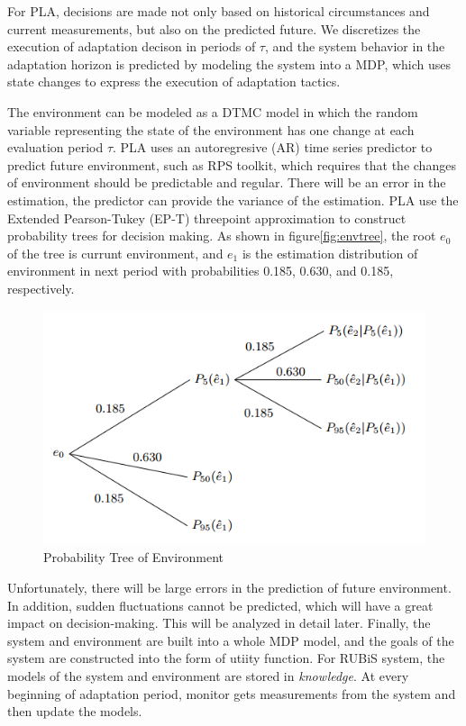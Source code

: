 \documentclass[sigconf]{acmart}
\begin{document}
For PLA, decisions are made not only based on historical circumstances and current measurements, but also on the predicted future. We discretizes the execution of adaptation decison in periods of $\tau$, and the system behavior in the adaptation horizon is predicted by modeling the system into a MDP, which uses state changes to express the execution of adaptation tactics.

The environment can be modeled as a DTMC model in which the random variable representing the state of the environment has one change at each evaluation period $\tau$. PLA uses an autoregresive (AR) time series predictor to predict future environment, such as RPS toolkit, which requires that the changes of environment should be predictable and regular. There will be an error in the estimation, the predictor can provide the variance of the estimation. PLA use the Extended Pearson-Tukey (EP-T) threepoint approximation to construct probability trees for decision making. As shown in figure\ref{fig:envtree}, the root $e_{0}$ of the tree is currunt environment, and $e_{1}$ is the estimation distribution of environment in next period with probabilities 0.185, 0.630, and 0.185, respectively.
\begin{figure}[h]
	\centering
	\includegraphics[width=\linewidth]{envtree}
	\caption{Probability Tree of Environment}
\end{figure}

Unfortunately, there will be large errors in the prediction of future environment. In addition, sudden fluctuations cannot be predicted, which will have a great impact on decision-making. This will be analyzed in detail later. Finally, the system and environment are built into a whole MDP model, and the goals of the system are constructed into the form of utiity function. 
For RUBiS system, the models of the system and environment are stored in \textit{knowledge}. At every beginning of adaptation period, monitor gets measurements from the system and then update the models. 
\end{document}
